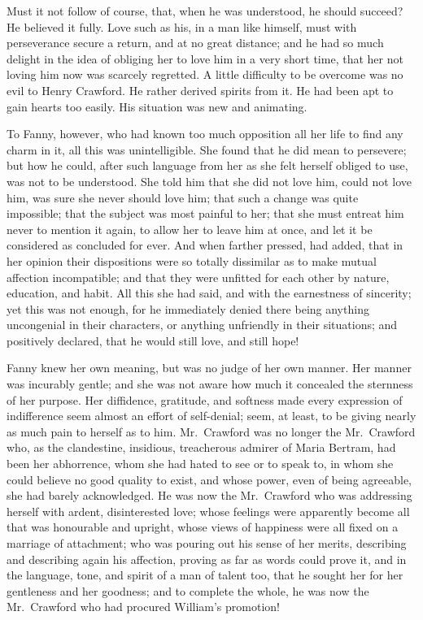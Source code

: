 \documentclass{article}
\begin{document}
Must it not follow of course, that, when he was understood,
he should succeed?  He believed it fully.  Love such as his,
in a man like himself, must with perseverance secure a return,
and at no great distance; and he had so much delight in
the idea of obliging her to love him in a very short time,
that her not loving him now was scarcely regretted.
A little difficulty to be overcome was no evil to
Henry Crawford.  He rather derived spirits from it.
He had been apt to gain hearts too easily.  His situation
was new and animating.

To Fanny, however, who had known too much opposition all her
life to find any charm in it, all this was unintelligible.
She found that he did mean to persevere; but how he could,
after such language from her as she felt herself obliged
to use, was not to be understood.  She told him that she
did not love him, could not love him, was sure she never
should love him; that such a change was quite impossible;
that the subject was most painful to her; that she must
entreat him never to mention it again, to allow her to leave
him at once, and let it be considered as concluded for ever.
And when farther pressed, had added, that in her opinion
their dispositions were so totally dissimilar as to make
mutual affection incompatible; and that they were unfitted
for each other by nature, education, and habit.  All this
she had said, and with the earnestness of sincerity;
yet this was not enough, for he immediately denied there
being anything uncongenial in their characters, or anything
unfriendly in their situations; and positively declared,
that he would still love, and still hope!

Fanny knew her own meaning, but was no judge of her own manner.
Her manner was incurably gentle; and she was not aware
how much it concealed the sternness of her purpose.
Her diffidence, gratitude, and softness made every expression
of indifference seem almost an effort of self-denial;
seem, at least, to be giving nearly as much pain to herself
as to him.  Mr.\ Crawford was no longer the Mr.\ Crawford who,
as the clandestine, insidious, treacherous admirer of
Maria Bertram, had been her abhorrence, whom she had hated
to see or to speak to, in whom she could believe no good
quality to exist, and whose power, even of being agreeable,
she had barely acknowledged.  He was now the Mr.\ Crawford
who was addressing herself with ardent, disinterested love;
whose feelings were apparently become all that was
honourable and upright, whose views of happiness were all
fixed on a marriage of attachment; who was pouring out
his sense of her merits, describing and describing again
his affection, proving as far as words could prove it,
and in the language, tone, and spirit of a man of talent too,
that he sought her for her gentleness and her goodness;
and to complete the whole, he was now the Mr.\ Crawford
who had procured William's promotion!
\end{document}
